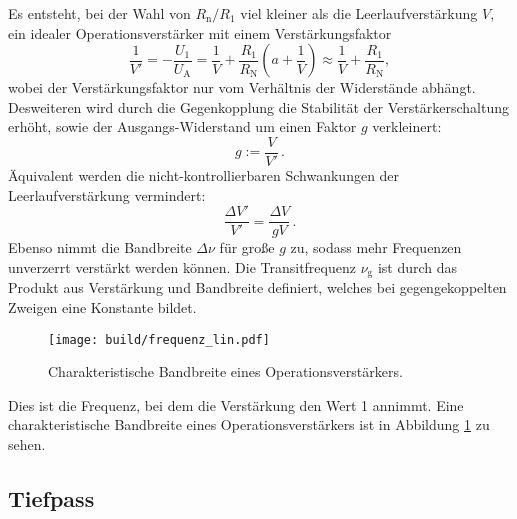 Es entsteht, bei der Wahl von $R_\text{n}/ R_\text{1}$ viel kleiner als die
Leerlaufverstärkung $V$, ein idealer Operationsverstärker mit einem Verstärkungsfaktor
\begin{equation}
  \label{eq:v_strich}
		\frac{1}{V'}= - \frac{U_1}{U_\text{A}} = \frac{1}{V} +
		\frac{R_1}{R_\text{N}} \left( a + \frac{1}{V} \right) \approx
		\frac{1}{V} + \frac{R_1}{R_\text{N}},
\end{equation}
wobei der Verstärkungsfaktor nur vom Verhältnis der Widerstände abhängt.
Desweiteren wird durch die Gegenkopplung die Stabilität der
Verstärkerschaltung erhöht, sowie der Ausgangs-Widerstand um einen
Faktor $g$ verkleinert:
\begin{equation}
		g := \frac{V}{V'} \, .
\end{equation}
Äquivalent werden die nicht-kontrollierbaren Schwankungen der
Leerlaufverstärkung vermindert:
\begin{equation}
		\frac{\Delta V'}{V'} = \frac{\Delta V}{g V} \, .
\end{equation}
Ebenso nimmt die Bandbreite $\Delta \nu$ für große $g$ zu, sodass 
mehr Frequenzen unverzerrt verstärkt werden können.
Die Transitfrequenz $\nu_\text{g}$ ist durch das Produkt aus Verstärkung und
Bandbreite definiert, welches bei gegengekoppelten Zweigen eine Konstante
bildet.
\begin{figure}[ht]
		\centering
		\texttt{[image: build/frequenz\_lin.pdf]}
		\caption{Charakteristische Bandbreite eines Operationsverstärkers.\cite{anleitung}}
		\label{fig:freq}
\end{figure}
Dies ist die Frequenz, bei dem die Verstärkung den Wert 1 annimmt.
Eine charakteristische Bandbreite eines Operationsverstärkers ist in Abbildung
\ref{fig:freq} zu sehen.

\subsection{Tiefpass}%
\label{sub:tiefpass}

